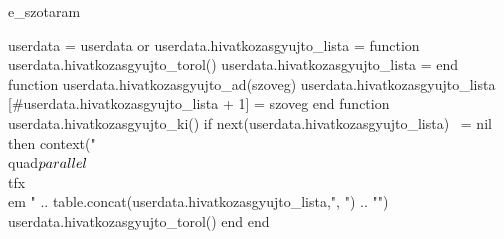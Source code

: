 \startenvironment e_szotaram

\startluacode
  userdata = userdata or {}
  userdata.hivatkozasgyujto_lista = {}
  function userdata.hivatkozasgyujto_torol()
    userdata.hivatkozasgyujto_lista = {}
  end
  function userdata.hivatkozasgyujto_ad(szoveg)
    userdata.hivatkozasgyujto_lista [#userdata.hivatkozasgyujto_lista + 1] = szoveg
  end
  function userdata.hivatkozasgyujto_ki()
    if next(userdata.hivatkozasgyujto_lista) ~= nil then
      context("\\quad$\\parallel$~{\\tfx\\em " .. table.concat(userdata.hivatkozasgyujto_lista,", ") .. "}")
      userdata.hivatkozasgyujto_torol()
    end
  end
\stopluacode





\def\Szotextcommand#1{\hbox{#1\enspace\bullet\enspace}}


\setupfloats[szo][sidealign=line]


\setuphead[Szo][%
  number=no,%
  before=\relax,%
  textdistance=0pt,%
  insidesection={\resetcounter[SzoBekSzam]},%
  style=\bf,%
]

